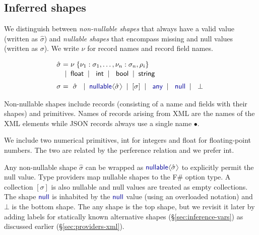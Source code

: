 \documentclass[10pt,preprint,blind,clearpagebib]{sigplanconf}
\newcommand{\langl}{\begin{picture}(4.5,7)
\put(1.1,2.5){\rotatebox{60}{\line(1,0){5.5}}}
\put(1.1,2.5){\rotatebox{300}{\line(1,0){5.5}}}
\end{picture}}
\newcommand{\rangl}{\begin{picture}(4.5,7)
\put(.9,2.5){\rotatebox{120}{\line(1,0){5.5}}}
\put(.9,2.5){\rotatebox{240}{\line(1,0){5.5}}}
\end{picture}}
\newcommand{\kvd}[1]{\textnormal{\textcolor{kvdclr}{\sffamily #1}}}
\newcommand{\ident}[1]{\textnormal{\sffamily #1}}
\newcommand{\lsep}[0]{\;\; | \;\;}
\newcommand{\narrow}[1]{\hspace{-0.7em} #1 \hspace{-0.7em}}
\begin{document}

\subsection{Inferred shapes}
\label{sec:inference-types}

We distinguish between \emph{non-nullable shapes} that always have a valid value (written as 
$\hat{\sigma}$) and \emph{nullable shapes} that encompass missing and \kvd{null} values 
(written as $\sigma$). We write $\nu$ for record names and record field names. 

\noindent
\begin{equation*}
\begin{array}{rcl}
 \hat{\sigma} &\narrow{=}& \nu \; \{ \nu_1 : \sigma_1, \ldots, \nu_n : \sigma_n, \rho_i  \} \\[0.1em]
                &\narrow{|}& \ident{float} \lsep \ident{int} \lsep \ident{bool} \lsep \ident{string} 
 \\[0.6em] 
       \sigma &\narrow{=}& ~\hat{\sigma}~ \lsep \kvd{nullable}\langl \hat{\sigma} \rangl \lsep [\sigma] \lsep \kvd{any} \lsep \kvd{null}  \lsep ~\bot~
\end{array}
\end{equation*}

\noindent
Non-nullable shapes include records (consisting of a name and fields with their shapes) and 
primitives. Names of records arising from XML are the names of the XML elements while
JSON records always use a single name $\bullet$.

We include two numerical primitives, \ident{int} for integers and \ident{float} for floating-point 
numbers. The two are related by the perference relation and we prefer \ident{int}.

Any non-nullable shape $\hat{\sigma}$ can be wrapped as $\kvd{nullable}\langl\hat{\sigma}\rangl$ to 
explicitly permit the \kvd{null} value. Type providers map \kvd{nullable} shapes to the F\# option
type. A collection $[\sigma]$ is also nullable and \kvd{null} values are treated as empty 
collections. The shape $\kvd{null}$ is inhabited by the $\kvd{null}$ value (using an overloaded 
notation) and $\bot$ is the bottom shape. The \kvd{any} shape is the top shape, but we revisit it 
later by adding labels for statically known alternative shapes (\S\ref{sec:inference-vars}) as 
discussed earlier (\S\ref{sec:providers-xml}).
\end{document}
